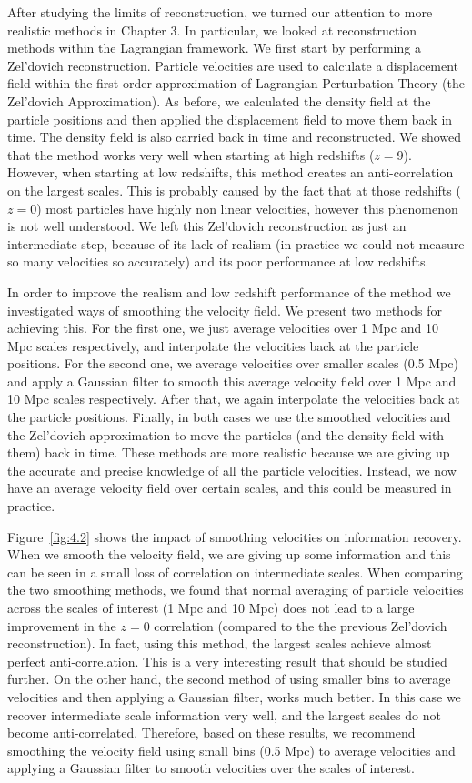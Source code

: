 After studying the limits of reconstruction, we turned our attention to more realistic methods in Chapter 3. In particular, we looked at reconstruction methods within the Lagrangian framework. We first start by performing a Zel'dovich reconstruction. Particle velocities are used to calculate a displacement field within the first order approximation of Lagrangian Perturbation Theory (the Zel'dovich Approximation). As before, we calculated the density field at the particle positions and then applied the displacement field to move them back in time. The density field is also carried back in time and reconstructed. We showed that the method works very well when starting at high redshifts ($z=9$). However, when starting at low redshifts, this method creates an anti-correlation on the largest scales. This is probably caused by the fact that at those redshifts ($z=0$) most particles have highly non linear velocities, however this phenomenon is not well understood. We left this Zel'dovich reconstruction as just an intermediate step, because of its lack of realism (in practice we could not measure so many velocities so accurately) and its poor performance at low redshifts.

In order to improve the realism and low redshift performance of the method we investigated ways of smoothing the velocity field. We present two methods for achieving this. For the first one, we just average velocities over 1 Mpc and 10 Mpc scales respectively, and interpolate the velocities back at the particle positions. For the second one, we average velocities over smaller scales (0.5 Mpc) and apply a Gaussian filter to smooth this average velocity field over 1 Mpc and 10 Mpc scales respectively. After that, we again interpolate the velocities back at the particle positions. Finally, in both cases we use the smoothed velocities and the Zel'dovich approximation to move the particles (and the density field with them) back in time. These methods are more realistic because we are giving up the accurate and precise knowledge of all the particle velocities. Instead, we now have an average velocity field over certain scales, and this could be measured in practice. 

Figure~\ref{fig:4.2} shows the impact of smoothing velocities on information recovery. When we smooth the velocity field, we are giving up some information and this can be seen in a small loss of correlation on intermediate scales. When comparing the two smoothing methods, we found that normal averaging of particle velocities across the scales of interest (1 Mpc and 10 Mpc) does not lead to a large improvement in the $z=0$ correlation (compared to the the previous Zel'dovich reconstruction). In fact, using this method, the largest scales achieve almost perfect anti-correlation. This is a very interesting result that should be studied further. On the other hand, the second method of using smaller bins to average velocities and then applying a Gaussian filter, works much better. In this case we recover intermediate scale information very well, and the largest scales do not become anti-correlated. Therefore, based on these results, we recommend smoothing the velocity field using small bins (0.5 Mpc) to average velocities and applying a Gaussian filter to smooth velocities over the scales of interest.

